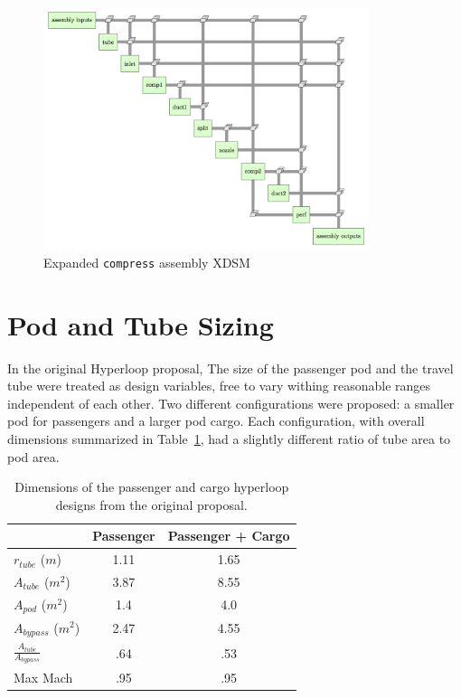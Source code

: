 \documentclass[heading.tex]{subfiles}
\begin{document}
\begin{figure}[H]
\centering
\includegraphics[width=0.85\textwidth]{images/compress_assembly_xdsm.png}
\caption{Expanded \texttt{compress} assembly XDSM}
\label{f:compressorXDSM}
\end{figure}


\section{Pod and Tube Sizing}
\label{s:sizing}

In the original Hyperloop proposal, The size of the passenger pod and the travel tube were treated as design variables, 
free to vary withing reasonable ranges independent of each other. Two different configurations were proposed: a smaller 
pod for passengers and a larger pod cargo. Each configuration, with overall dimensions summarized 
in Table~\ref{t:hyperbase}, had a slightly different ratio of tube area to pod area. 

\begin{table}
  \centering
  \caption{Dimensions of the passenger and cargo hyperloop designs from the original proposal. }
  \label{t:hyperbase}
  \begin{tabular}{l c c}
    \hline
                                  &  Passenger       & Passenger + Cargo \\ \hline
    $r_{tube}$ ($m$)              &        1.11      &     1.65  \\
    $A_{tube}$  ($m^2$)           &        3.87      &     8.55  \\
    $A_{pod}$ ($m^2$)             &        1.4       &     4.0   \\ 
    $A_{bypass}$ ($m^2$)          &        2.47      &     4.55  \\ 
    $\frac{A_{tube}}{A_{bypass}}$ &        .64       &     .53   \\
    Max Mach                      &        .95       &     .95   \\
    \hline
  \end{tabular}
\end{table}
\end{document}
